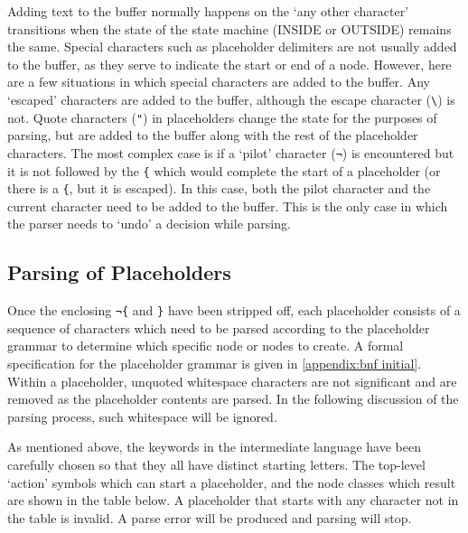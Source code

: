 Adding text to the buffer normally happens on the `any other character' transitions when the state of the state machine (INSIDE or OUTSIDE) remains the same. Special characters such as placeholder delimiters are not usually added to the buffer, as they serve to indicate the start or end of a node. However, here are a few situations in which special characters are added to the buffer. Any `escaped' characters are added to the buffer, although the escape character (\verb!\!) is not. Quote characters (\verb!"!) in placeholders change the state for the purposes of parsing, but are added to the buffer along with the rest of the placeholder characters. The most complex case is if a `pilot' character (\verb!¬!) is encountered but it is not followed by the \verb!{! which would complete the start of a placeholder (or there is a \verb!{!, but it is escaped). In this case, both the pilot character and the current character need to be added to the buffer. This is the only case in which the parser needs to `undo' a decision while parsing.

\subsection*{Parsing of Placeholders}
\label{gilt:parser:placeholders}

Once the enclosing \verb!¬{! and \verb!}! have been stripped off, each placeholder consists of a sequence of characters which need to be parsed according to the placeholder grammar to determine which specific node or nodes to create. A formal specification for the placeholder grammar is given in \autoref{appendix:bnf initial}. Within a placeholder, unquoted whitespace characters are not significant and are removed as the placeholder contents are parsed. In the following discussion of the parsing process, such whitespace will be ignored. 

As mentioned above, the keywords in the intermediate language have been carefully chosen so that they all have distinct starting letters. The top-level `action' symbols which can start a placeholder, and the node classes which result are shown in the table below. A placeholder that starts with any character not in the table is invalid. A parse error will be produced and parsing will stop.

